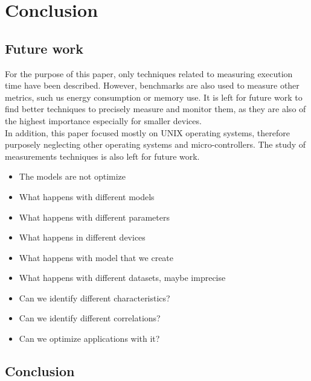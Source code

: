 \chapter{Conclusion}

\section{Future work}
For the purpose of this paper, only techniques related to measuring execution time have been described. However, benchmarks are also used to measure other metrics, such us energy consumption or memory use. It is left for future work to find better techniques to precisely measure and monitor them, as they are also of the highest importance especially for smaller devices. \\
In addition, this paper focused mostly on UNIX operating systems, therefore purposely neglecting other operating systems and micro-controllers. The study of measurements techniques is also left for future work. 
\begin{itemize}
\item The models are not optimize
\item What happens with different models
\item What happens with different parameters
\item What happens in different devices
\item What happens with model that we create
\item What happens with different datasets, maybe imprecise 
\item Can we identify different characteristics?
\item Can we identify different correlations?
\item Can we optimize applications with it?
\end{itemize}
\section{Conclusion}